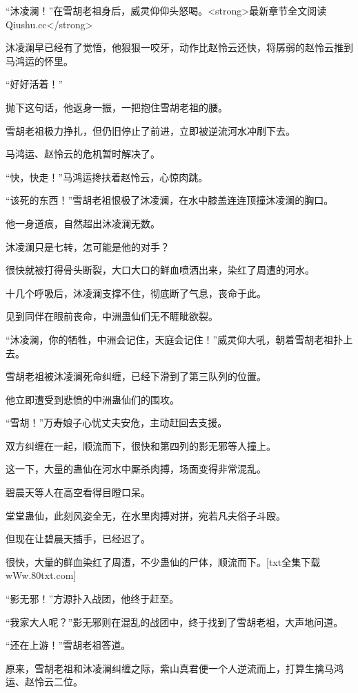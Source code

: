 
\begin{this_body}

“沐凌澜！”在雪胡老祖身后，威灵仰仰头怒喝。<strong>最新章节全文阅读Qiushu.cc</strong>

沐凌澜早已经有了觉悟，他狠狠一咬牙，动作比赵怜云还快，将孱弱的赵怜云推到马鸿运的怀里。

“好好活着！”

抛下这句话，他返身一振，一把抱住雪胡老祖的腰。

雪胡老祖极力挣扎，但仍旧停止了前进，立即被逆流河水冲刷下去。

马鸿运、赵怜云的危机暂时解决了。

“快，快走！”马鸿运搀扶着赵怜云，心惊肉跳。

“该死的东西！”雪胡老祖恨极了沐凌澜，在水中膝盖连连顶撞沐凌澜的胸口。

他一身道痕，自然超出沐凌澜无数。

沐凌澜只是七转，怎可能是他的对手？

很快就被打得骨头断裂，大口大口的鲜血喷洒出来，染红了周遭的河水。

十几个呼吸后，沐凌澜支撑不住，彻底断了气息，丧命于此。

见到同伴在眼前丧命，中洲蛊仙们无不睚眦欲裂。

“沐凌澜，你的牺牲，中洲会记住，天庭会记住！”威灵仰大吼，朝着雪胡老祖扑上去。

雪胡老祖被沐凌澜死命纠缠，已经下滑到了第三队列的位置。

他立即遭受到悲愤的中洲蛊仙们的围攻。

“雪胡！”万寿娘子心忧丈夫安危，主动赶回去支援。

双方纠缠在一起，顺流而下，很快和第四列的影无邪等人撞上。

这一下，大量的蛊仙在河水中厮杀肉搏，场面变得非常混乱。

碧晨天等人在高空看得目瞪口呆。

堂堂蛊仙，此刻风姿全无，在水里肉搏对拼，宛若凡夫俗子斗殴。

但现在让碧晨天插手，已经迟了。

很快，大量的鲜血染红了周遭，不少蛊仙的尸体，顺流而下。[txt全集下载wWw.80txt.com]

“影无邪！”方源扑入战团，他终于赶至。

“我家大人呢？”影无邪则在混乱的战团中，终于找到了雪胡老祖，大声地问道。

“还在上游！”雪胡老祖答道。

原来，雪胡老祖和沐凌澜纠缠之际，紫山真君便一个人逆流而上，打算生擒马鸿运、赵怜云二位。


\end{this_body}

